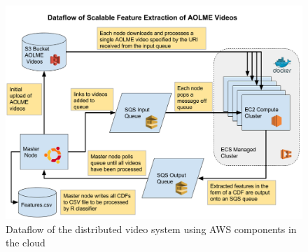 
\begin{figure}[t]
  \centering
  \includegraphics[width=.85\textwidth]{figures/extract_features_dataflow}
  \caption{Dataflow of the distributed video system using AWS components in the cloud}
  \label{fig:dataflow}
\end{figure}
%
%
%
%
%
%
%
%

